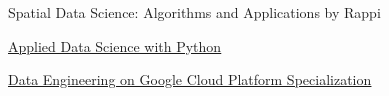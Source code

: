\begin{coursework}
    
        {Spatial Data Science: Algorithms and Applications by Rappi}
    
        {\href{https://www.youracclaim.com/badges/6f524dff-5ffb-42bd-8e32-f4f3ea50e26c/public_url}
        {\underline{Applied Data Science with Python}}}

        {\href{https://www.coursera.org/account/accomplishments/specialization/certificate/3MKRH4BJ5MKQ}
        {\underline{Data Engineering on Google Cloud Platform Specialization}}}

\end{coursework}